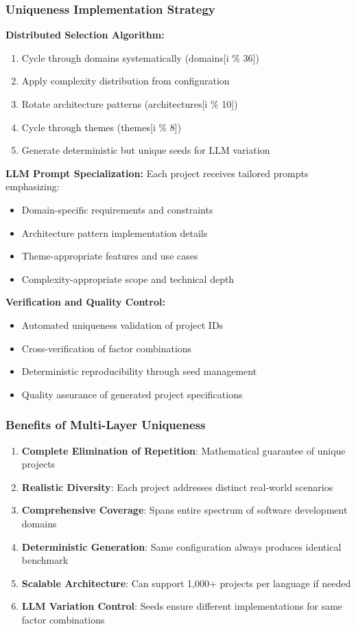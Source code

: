 \documentclass{article}
\begin{document}
\subsubsection{Uniqueness Implementation Strategy}

\textbf{Distributed Selection Algorithm:}
\begin{enumerate}
    \item Cycle through domains systematically (domains[i \% 36])
    \item Apply complexity distribution from configuration
    \item Rotate architecture patterns (architectures[i \% 10])
    \item Cycle through themes (themes[i \% 8])
    \item Generate deterministic but unique seeds for LLM variation
\end{enumerate}

\textbf{LLM Prompt Specialization:}
Each project receives tailored prompts emphasizing:
\begin{itemize}
    \item Domain-specific requirements and constraints
    \item Architecture pattern implementation details
    \item Theme-appropriate features and use cases
    \item Complexity-appropriate scope and technical depth
\end{itemize}

\textbf{Verification and Quality Control:}
\begin{itemize}
    \item Automated uniqueness validation of project IDs
    \item Cross-verification of factor combinations
    \item Deterministic reproducibility through seed management
    \item Quality assurance of generated project specifications
\end{itemize}

\subsubsection{Benefits of Multi-Layer Uniqueness}

\begin{enumerate}
    \item \textbf{Complete Elimination of Repetition}: Mathematical guarantee of unique projects
    \item \textbf{Realistic Diversity}: Each project addresses distinct real-world scenarios
    \item \textbf{Comprehensive Coverage}: Spans entire spectrum of software development domains
    \item \textbf{Deterministic Generation}: Same configuration always produces identical benchmark
    \item \textbf{Scalable Architecture}: Can support 1,000+ projects per language if needed
    \item \textbf{LLM Variation Control}: Seeds ensure different implementations for same factor combinations
\end{enumerate}
\end{document}
